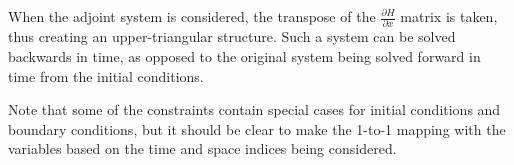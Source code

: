When the adjoint system is considered, the transpose of the $\frac{\partial H}{\partial x}$
matrix is taken, thus creating an upper-triangular structure. Such
a system can be solved backwards in time, as opposed to the original
system being solved forward in time from the initial conditions.

Note that some of the constraints contain special cases for initial
conditions and boundary conditions, but it should be clear to make
the 1-to-1 mapping with the variables based on the time and space
indices being considered.
